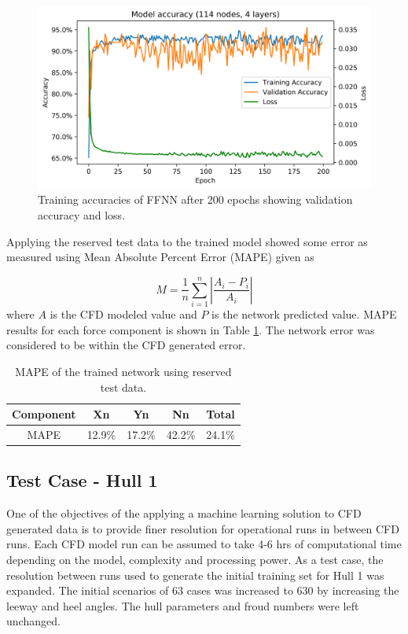 \documentclass[twoside,twocolumn]{article}
\begin{document}
\begin{figure}[!ht]
	\centering
	\includegraphics[width=.9\textwidth]{images/training_acc_loss.png}  
	\caption{Training accuracies of FFNN after 200 epochs showing validation accuracy and loss.}
	\label{fig:ffnn_training}
\end{figure}

Applying the reserved test data to the trained model showed some error as measured using Mean Absolute Percent Error (MAPE) given as 

\begin{equation}
M = \frac{1}{n}\sum_{i=1}^{n}\left | \frac{A_{i}-P_{i}}{A_{i}} \right |
\end{equation}
\noident
where $A$ is the CFD modeled value and $P$ is the network predicted value. MAPE results for each force component is shown in Table \ref{tab:test_results}. The network error was considered to be within the CFD generated error.

\begin{table}[]
\centering
\caption{MAPE of the trained network using reserved test data.}
\label{tab:test_results}
\begin{tabular}{@{}ccccc@{}}
\toprule
\textbf{Component} & \textbf{Xn} & \textbf{Yn} & \textbf{Nn} & \textbf{Total} \\ \midrule
MAPE & 12.9\% & 17.2\% & 42.2\% & 24.1\% \\ \bottomrule
\end{tabular}
\end{table}

\subsection{Test Case - Hull 1}
One of the objectives of the applying a machine learning solution to CFD generated data is to provide finer resolution for operational runs in between CFD runs. Each CFD model run can be assumed to take 4-6 hrs of computational time depending on the model, complexity and processing power. As a test case, the resolution between runs used to generate the initial training set for Hull 1 was expanded. The initial scenarios of 63 cases was increased to 630 by increasing the leeway and heel angles. The hull parameters and froud numbers were left unchanged. 
\end{document}
